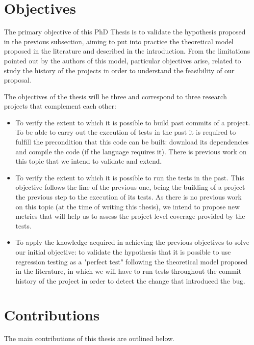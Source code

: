 \section{Objectives}

The primary objective of this PhD Thesis is to validate the hypothesis proposed in the previous subsection, aiming to put into practice the theoretical model proposed in the literature and described in the introduction. 
From the limitations pointed out by the authors of this model, particular objectives arise, related to study the history of the projects in order to understand the feasibility of our proposal.

The objectives of the thesis will be three and correspond to three research projects that complement each other:

\begin{itemize}
    \item To verify the extent to which it is possible to build past commits of a project. To be able to carry out the execution of tests in the past it is required to fulfill the precondition that this code can be built: download its dependencies and compile the code (if the language requires it). There is previous work on this topic that we intend to validate and extend.
    \item To verify the extent to which it is possible to run the tests in the past. This objective follows the line of the previous one, being the building of a project the previous step to the execution of its tests. As there is no previous work on this topic (at the time of writing this thesis), we intend to propose new metrics that will help us to assess the project level coverage provided by the tests.
    \item To apply the knowledge acquired in achieving the previous objectives to solve our initial objective: to validate the hypothesis that it is possible to use regression testing as a "perfect test" following the theoretical model proposed in the literature, in which we will have to run tests throughout the commit history of the project in order to detect the change that introduced the bug.
\end{itemize}

\section{Contributions}

The main contributions of this thesis are outlined below.

